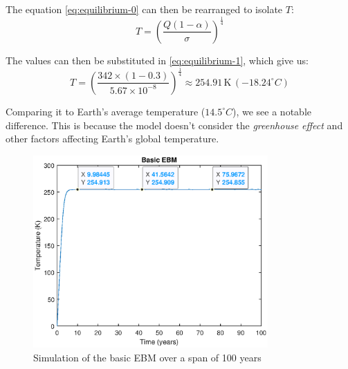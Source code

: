 \documentclass[12pt]{article}
\begin{document}
\noindent The equation \ref{eq:equilibrium-0} can then be rearranged to isolate $T$:
\begin{equation} \label{eq:equilibrium-1}
T = \left( \frac{Q(1 - \alpha)}{\sigma} \right)^{\frac{1}{4}}
\end{equation}

\noindent The values can then be substituted in \ref{eq:equilibrium-1}, which give us:
\begin{equation}
    T = \left( \frac{342 \times (1 - 0.3)}{5.67 \times 10^{-8}} \right)^{\frac{1}{4}} \approx 254.91 \, \text{K} \, ({-18.24}^\circ C)
\end{equation}

Comparing it to Earth's average temperature (${14.5}^\circ C$), we see a notable difference. This is because the model doesn't consider the \textit{greenhouse effect} and other factors affecting Earth's global temperature.

\begin{figure}[!hbt]
    \centering
    \includegraphics[width=0.8\textwidth]{images/ebm_basic.eps}
    \caption{Simulation of the basic EBM over a span of 100 years}
    \label{fig:basic_ebm}
\end{figure}

\end{document}
